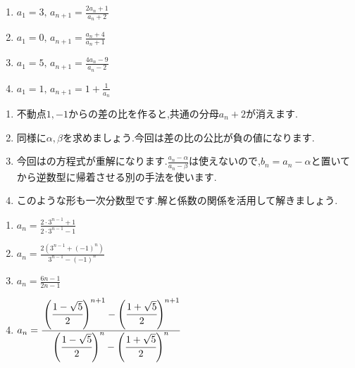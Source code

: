 \noindent {}\par\nobreak
\begin{enumerate}[label=(\arabic*),parsep=3pt,format=\bookitemlink{example-mobius-1}{problem}{hint}]
  \item $a_1=3,\, a_{n+1}=\frac{2a_n+1}{a_n+2}$
  \item $a_1=0,\, a_{n+1}=\frac{a_n+4}{a_n+1}$
  \item $a_1=5,\, a_{n+1}=\frac{4a_{n}-9}{a_{n}-2}$
  \item $a_1=1,\, a_{n+1}=1+\frac{1}{a_n}$
\end{enumerate}

\noindent{}\par\nobreak
\begin{enumerate}[label=(\arabic*),parsep=3pt,format=\bookitemlink{example-mobius-1}{hint}{answer}]
  \item 不動点$1,-1$からの差の比を作ると,共通の分母$a_n+2$が消えます.
  \item 同様に$\alpha,\beta$を求めましょう.今回は差の比の公比が負の値になります.
  \item 今回はの方程式が重解になります.$\frac{a_n-\alpha}{a_n-\beta}$は使えないので,$b_n=a_n-\alpha$と置いてから逆数型に帰着させる別の手法を使います.
  \item このような形も一次分数型です.解と係数の関係を活用して解きましょう.
\end{enumerate}

\noindent{}\par\nobreak
\begin{enumerate}[label=(\arabic*),parsep=3pt,format=\bookitemlink{example-mobius-1}{answer}{solution}]
  \item $a_n=\frac{2\cdot3^{n-1}+1}{2\cdot3^{n-1}-1}$
  \item $a_n=\frac{2\left(3^{n-1}+(-1)^n\right)}{3^{n-1}-(-1)^n}$
  \item $a_{n}=\frac{6n-1}{2n-1}$
  \item $a_n=\cfrac{\left(\cfrac{1-\sqrt{5}}{2}\right)^{n+1}-\left(\cfrac{1+\sqrt{5}}{2}\right)^{n+1}}{\left(\cfrac{1-\sqrt{5}}{2}\right)^n-\left(\cfrac{1+\sqrt{5}}{2}\right)^n}$
\end{enumerate}

